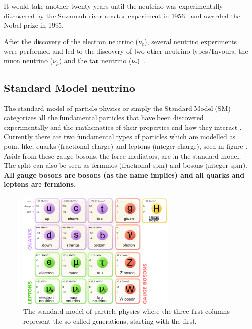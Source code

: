 It would take another twenty years until the neutrino was experimentally discovered by the Savannah river reactor experiment in 1956~\cite{6Reines} and awarded the Nobel prize in 1995.

After the discovery of the electron neutrino ($\nu_e$), several neutrino experiments were performed and led to the discovery of two other neutrino types/flavours, the muon neutrino ($\nu_\mu$) and the tau neutrino ($\nu_\tau$)~\cite{7Danby, 8Perl, Fix1}.

\subsection{Standard Model neutrino}\label{subsection:SMN}
The standard model of particle physics or simply the Standard Model (SM) categorizes all the fundamental particles that have been discovered experimentally and the mathematics of their properties and how they interact \cite{32Burchan:1995, 38griffiths}. Currently there are two fundamental types of particles which are modelled as point like, quarks (fractional charge) and leptons (integer charge), seen in figure . Aside from these gauge bosons, the force mediators, are in the standard model. The split can also be seen as ferminos (fractional spin) and bosons (integer spin). \textbf{All gauge bosons are bosons (as the name implies) and all quarks and leptons are fermions.}

\begin{figure}[h!]
\includegraphics[width=0.7\textwidth]{figures/Standard_Model_of_Elementary_Particles.png}
\caption{The standard model of particle physics where the three first columns represent the so called generations, starting with the first. \cite{33wiki1:Online}}
 \label{fig:standardModel}
\end{figure}

